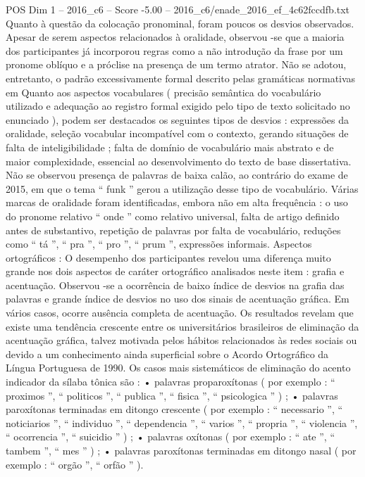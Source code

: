 \begin{textsample}{POS Dim 1 – 2016\_c6 – Score -5.00 – 2016\_c6/enade\_2016\_ef\_4c62fccdfb.txt}
Quanto à questão da colocação pronominal, foram poucos os desvios observados.
Apesar de serem aspectos relacionados à oralidade, observou -se que a maioria dos participantes já incorporou regras como a não introdução da frase por um pronome oblíquo e a próclise na presença de um termo atrator.
Não se adotou, entretanto, o padrão excessivamente formal descrito pelas gramáticas normativas em Quanto aos aspectos vocabulares ( precisão semântica do vocabulário utilizado e adequação ao registro formal exigido pelo tipo de texto solicitado no enunciado ), podem ser destacados os seguintes tipos de desvios : expressões da oralidade, seleção vocabular incompatível com o contexto, gerando situações de falta de inteligibilidade ; falta de domínio de vocabulário mais abstrato e de maior complexidade, essencial ao desenvolvimento do texto de base dissertativa.
Não se observou presença de palavras de baixa calão, ao contrário do exame de 2015, em que o tema “ funk ” gerou a utilização desse tipo de vocabulário.
Várias marcas de oralidade foram identificadas, embora não em alta frequência : o uso do pronome relativo “ onde ” como relativo universal, falta de artigo definido antes de substantivo, repetição de palavras por falta de vocabulário, reduções como “ tá ”, “ pra ”, “ pro ”, “ prum ”, expressões informais.
Aspectos ortográficos : O desempenho dos participantes revelou uma diferença muito grande nos dois aspectos de caráter ortográfico analisados neste item : grafia e acentuação.
Observou -se a ocorrência de baixo índice de desvios na grafia das palavras e grande índice de desvios no uso dos sinais de acentuação gráfica.
Em vários casos, ocorre ausência completa de acentuação.
Os resultados revelam que existe uma tendência crescente entre os universitários brasileiros de eliminação da acentuação gráfica, talvez motivada pelos hábitos relacionados às redes sociais ou devido a um conhecimento ainda superficial sobre o Acordo Ortográfico da Língua Portuguesa de 1990.
Os casos mais sistemáticos de eliminação do acento indicador da sílaba tônica são : • palavras proparoxítonas ( por exemplo : “ proximos ”, “ politicos ”, “ publica ”, “ fisica ”, “ psicologica ” ) ; • palavras paroxítonas terminadas em ditongo crescente ( por exemplo : “ necessario ”, “ noticiarios ”, “ individuo ”, “ dependencia ”, “ varios ”, “ propria ”, “ violencia ”, “ ocorrencia ”, “ suicidio ” ) ; • palavras oxítonas ( por exemplo : “ ate ”, “ tambem ”, “ mes ” ) ; • palavras paroxítonas terminadas em ditongo nasal ( por exemplo : “ orgão ”, “ orfão ” ).

\end{textsample}
